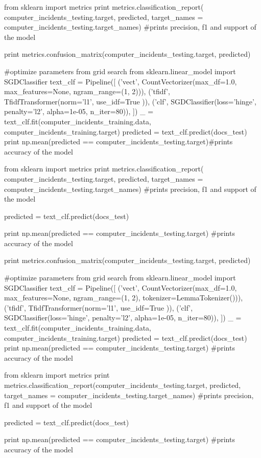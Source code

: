 \begin{pyverbatim}
from sklearn import metrics
print metrics.classification_report(
    computer_incidents_testing.target, predicted,
    target_names = computer_incidents_testing.target_names) 
#prints precision, f1 and support of the model


print metrics.confusion_matrix(computer_incidents_testing.target, predicted)

#optimize parameters from grid search
from sklearn.linear_model import SGDClassifier
text_clf = Pipeline([
     ('vect', CountVectorizer(max_df=1.0, max_features=None, ngram_range=(1, 2))),
     ('tfidf', TfidfTransformer(norm='l1', use_idf=True )),
     ('clf', SGDClassifier(loss='hinge', penalty='l2',
                          alpha=1e-05, n_iter=80)),
])
_ = text_clf.fit(computer_incidents_training.data, computer_incidents_training.target)
predicted = text_clf.predict(docs_test)
print np.mean(predicted == computer_incidents_testing.target)#prints accuracy of the model

from sklearn import metrics
print metrics.classification_report(
    computer_incidents_testing.target, predicted,
    target_names = computer_incidents_testing.target_names) 
#prints precision, f1 and support of the model

predicted = text_clf.predict(docs_test)

print np.mean(predicted == computer_incidents_testing.target)
#prints accuracy of the model

print metrics.confusion_matrix(computer_incidents_testing.target, predicted)

#optimize parameters from grid search
from sklearn.linear_model import SGDClassifier
text_clf = Pipeline([
     ('vect', CountVectorizer(max_df=1.0, max_features=None, ngram_range=(1, 2), tokenizer=LemmaTokenizer())),
     ('tfidf', TfidfTransformer(norm='l1', use_idf=True )),
     ('clf', SGDClassifier(loss='hinge', penalty='l2',
                           alpha=1e-05, n_iter=80)),
])
_ = text_clf.fit(computer_incidents_training.data, computer_incidents_training.target)
predicted = text_clf.predict(docs_test)
print np.mean(predicted == computer_incidents_testing.target)
#prints accuracy of the model

from sklearn import metrics
print metrics.classification_report(computer_incidents_testing.target, predicted,
target_names = computer_incidents_testing.target_names) 
#prints precision, f1 and support of the model

predicted = text_clf.predict(docs_test)

print np.mean(predicted == computer_incidents_testing.target)
#prints accuracy of the model


\end{pyverbatim}
